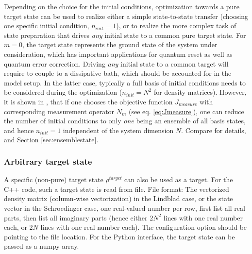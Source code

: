 \documentclass[11pt]{article}
\begin{document}
Depending on the choice for the initial conditions, optimization towards a pure target state can be used to realize either a simple state-to-state transfer (choosing one specific initial condition, $n_{init}=1$), or to realize the more complex task of state preparation that drives \textit{any} initial state to a common pure target state. 
For $m=0$, the target state represents the ground state of the system under consideration, which has important applications for quantum reset as well as quantum error correction. Driving \textit{any} initial state to a common target will require to couple to a dissipative bath, which should be accounted for in the model setup. In the latter case, typically a full basis of initial conditions needs to be considered during the optimization ($n_{init}=N^2$ for density matrices). However, it is shown in \cite{guenther2021quantum}, that if one chooses the objective function $J_{measure}$ with corresponding measurement operator $N_m$ (see eq. \eqref{eq:Jmeasure}), one can reduce the number of initial conditions to only \textit{one} being an ensemble of all basis states, and hence $n_{init}=1$ independent of the system dimension $N$. Compare \cite{guenther2021quantum} for details, and Section \ref{sec:ensemblestate}. 



\subsubsection{Arbitrary target state}
A specific (non-pure) target state $\rho^{target}$ can also be used as a target. For the C++ code, such a target state is read from file. File format: The vectorized density matrix (column-wise vectorization) in the Lindblad case, or the state vector in the Schroedinger case, one real-valued number per row, first list all real parts, then list all imaginary parts (hence either $2N^2$ lines with one real number each, or $2N$ lines with one real number each). The configuration option should be pointing to the file location. For the Python interface, the target state can be passed as a numpy array. 
 
\end{document}
